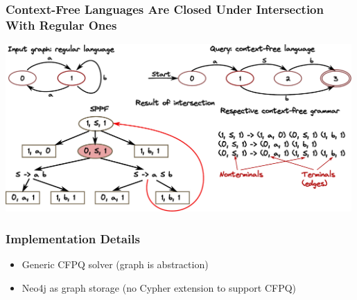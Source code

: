 \documentclass[xcolor=table,aspectratio=169]{beamer}
\newcommand{\nodeDistanceRsm}{2.5cm}
\begin{document}
\begin{frame}[fragile] \frametitle{Context-Free Languages Are Closed Under Intersection With Regular Ones}
  \begin{center}
      \includegraphics[width=0.99\textwidth]{pictures/Intersection.pdf}
  \end{center}
\end{frame}


%
%
%




\begin{frame}[fragile] \frametitle{Implementation Details}
  \begin{itemize}
  \item Generic CFPQ solver (graph is abstraction)
  \item Neo4j as graph storage (no Cypher extension to support CFPQ)  
  \end{itemize}
\end{frame}
\end{document}
